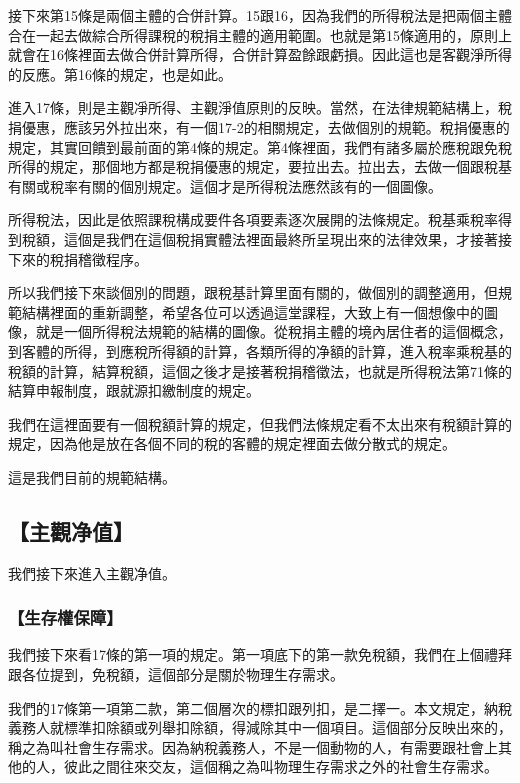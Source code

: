 \documentclass[oneside,sub3section]{ctexbook}
\begin{document}
接下來第15條是兩個主體的合併計算。15跟16，因為我們的所得稅法是把兩個主體合在一起去做綜合所得課稅的稅捐主體的適用範圍。也就是第15條適用的，原則上就會在16條裡面去做合併計算所得，合併計算盈餘跟虧損。因此這也是客觀淨所得的反應。第16條的規定，也是如此。

進入17條，則是主觀凈所得、主觀淨值原則的反映。當然，在法律規範結構上，稅捐優惠，應該另外拉出來，有一個17-2的相關規定，去做個別的規範。稅捐優惠的規定，其實回饋到最前面的第4條的規定。第4條裡面，我們有諸多屬於應稅跟免稅所得的規定，那個地方都是稅捐優惠的規定，要拉出去。拉出去，去做一個跟稅基有關或稅率有關的個別規定。這個才是所得稅法應然該有的一個圖像。

所得稅法，因此是依照課稅構成要件各項要素逐次展開的法條規定。稅基乘稅率得到稅額，這個是我們在這個稅捐實體法裡面最終所呈現出來的法律效果，才接著接下來的稅捐稽徵程序。

所以我們接下來談個別的問題，跟稅基計算里面有關的，做個別的調整適用，但規範結構裡面的重新調整，希望各位可以透過這堂課程，大致上有一個想像中的圖像，就是一個所得稅法規範的結構的圖像。從稅捐主體的境內居住者的這個概念，到客體的所得，到應稅所得額的計算，各類所得的净額的計算，進入稅率乘稅基的稅額的計算，結算稅額，這個之後才是接著稅捐稽徵法，也就是所得稅法第71條的結算申報制度，跟就源扣繳制度的規定。

我們在這裡面要有一個稅額計算的規定，但我們法條規定看不太出來有稅額計算的規定，因為他是放在各個不同的稅的客體的規定裡面去做分散式的規定。

這是我們目前的規範結構。

\hypertarget{ux4e3bux89c0ux51c0ux503c}{%
\subsection{【主觀净值】}\label{ux4e3bux89c0ux51c0ux503c}}

我們接下來進入主觀净值。

\hypertarget{ux751fux5b58ux6b0aux4fddux969c}{%
\subsubsection{【生存權保障】}\label{ux751fux5b58ux6b0aux4fddux969c}}

我們接下來看17條的第一項的規定。第一項底下的第一款免稅額，我們在上個禮拜跟各位提到，免稅額，這個部分是關於物理生存需求。

我們的17條第一項第二款，第二個層次的標扣跟列扣，是二擇一。本文規定，納稅義務人就標準扣除額或列舉扣除額，得減除其中一個項目。這個部分反映出來的，稱之為叫社會生存需求。因為納稅義務人，不是一個動物的人，有需要跟社會上其他的人，彼此之間往來交友，這個稱之為叫物理生存需求之外的社會生存需求。
\end{document}
